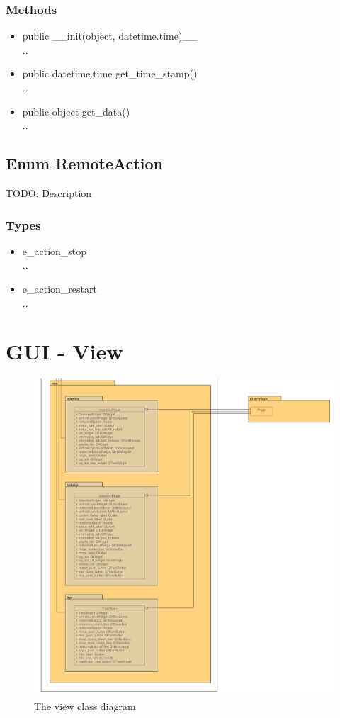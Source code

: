 \subsubsection{Methods}
\begin{itemize}
  \item public \_\_init(object, datetime.time)\_\_\\
  ..
  \item public datetime.time get\_time\_stamp()\\
  ..
  \item public object get\_data()\\
  ..
\end{itemize}

\subsection{Enum RemoteAction}
TODO: Description
\subsubsection{Types}
\begin{itemize}
	\item e\_action\_stop\\
	..
	\item e\_action\_restart\\
	..
\end{itemize}

\section{GUI - View}
\begin{figure}[!ht]
\begin{center}
\includegraphics[width=\linewidth]{./bilder/view.png}
\caption{The view class diagram}
\end{center}
\end{figure}

